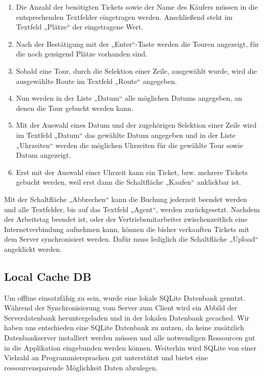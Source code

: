 \documentclass[12pt,a4paper,ngerman,english]{report}
\begin{document}
\begin{enumerate}
\item Die Anzahl der benötigten Tickets sowie der Name des Käufers müssen in die entsprechenden Textfelder eingetragen werden. Anschließend steht im Textfeld „Plätze“ der eingetragene Wert.
\item Nach der Bestätigung mit der „Enter“-Taste werden die Touren angezeigt, für die noch genügend Plätze vorhanden sind.
\item Sobald eine Tour, durch die Selektion einer Zeile, ausgewählt wurde, wird die ausgewählte Route im Textfeld „Route“ angegeben.
\item Nun werden in der Liste „Datum“ alle möglichen Datums angegeben, an denen die Tour gebucht werden kann.
\item Mit der Auswahl eines Datum und der zugehörigen Selektion einer Zeile wird im Textfeld „Datum“ das gewählte Datum angegeben und in der Liste „Uhrzeiten“ werden die möglichen Uhrzeiten für die gewählte Tour sowie Datum angezeigt.
\item Erst mit der Auswahl einer Uhrzeit kann ein Ticket, bzw. mehrere Tickets gebucht werden, weil erst dann die Schaltfläche „Kaufen“ anklickbar ist.
\end{enumerate}
Mit der Schaltfläche „Abbrechen“ kann die Buchung jederzeit beendet werden und alle Textfelder, bis auf das Textfeld „Agent“, werden zurückgesetzt. Nachdem der Arbeitstag beendet ist, oder der Vertriebsmitarbeiter zwischenzeitlich eine Internetverbindung aufnehmen kann, können die bisher verkauften Tickets mit dem Server synchronisiert werden. Dafür muss lediglich die Schaltfläche „Upload“ angeklickt werden.\\


\subsection{Local Cache DB}
Um offline einsatzfähig zu sein, wurde eine lokale SQLite Datenbank genutzt. Während der Synchronisierung vom Server zum Client wird ein Abbild der Serverdatenbank heruntergeladen und in der lokalen Datenbank gecached. Wir haben uns entschieden eine SQLite Datenbank zu nutzen, da keine zusätzlich Datenbankserver installiert werden müssen und alle notwendigen Ressourcen gut in die Applikation eingebunden werden können. Weiterhin wird SQLite von einer Vielzahl an Programmiersprachen gut unterstützt und bietet eine ressourcensparende Möglichkeit Daten abzulegen. \\
\end{document}
